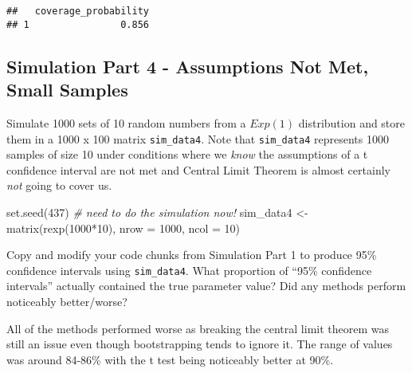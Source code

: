 \documentclass[
]{article}
\newenvironment{Shaded}{\begin{snugshade}}{\end{snugshade}}
\newcommand{\AttributeTok}[1]{\textcolor[rgb]{0.77,0.63,0.00}{#1}}
\newcommand{\CommentTok}[1]{\textcolor[rgb]{0.56,0.35,0.01}{\textit{#1}}}
\newcommand{\DecValTok}[1]{\textcolor[rgb]{0.00,0.00,0.81}{#1}}
\newcommand{\FunctionTok}[1]{\textcolor[rgb]{0.00,0.00,0.00}{#1}}
\newcommand{\NormalTok}[1]{#1}
\newcommand{\OtherTok}[1]{\textcolor[rgb]{0.56,0.35,0.01}{#1}}
\newcommand{\SpecialCharTok}[1]{\textcolor[rgb]{0.00,0.00,0.00}{#1}}
\begin{document}
\begin{verbatim}
##   coverage_probability
## 1                0.856
\end{verbatim}

\hypertarget{simulation-part-4---assumptions-not-met-small-samples}{%
\subsection{Simulation Part 4 - Assumptions Not Met, Small
Samples}\label{simulation-part-4---assumptions-not-met-small-samples}}

Simulate 1000 sets of 10 random numbers from a \(Exp(1)\) distribution
and store them in a 1000 x 100 matrix \texttt{sim\_data4}. Note that
\texttt{sim\_data4} represents 1000 samples of size 10 under conditions
where we \emph{know} the assumptions of a t confidence interval are not
met and Central Limit Theorem is almost certainly \emph{not} going to
cover us.

\begin{Shaded}
\begin{Highlighting}[]
\FunctionTok{set.seed}\NormalTok{(}\DecValTok{437}\NormalTok{)}
\CommentTok{\# need to do the simulation now!}
\NormalTok{sim\_data4 }\OtherTok{\textless{}{-}} \FunctionTok{matrix}\NormalTok{(}\FunctionTok{rexp}\NormalTok{(}\DecValTok{1000}\SpecialCharTok{*}\DecValTok{10}\NormalTok{), }\AttributeTok{nrow =} \DecValTok{1000}\NormalTok{, }\AttributeTok{ncol =} \DecValTok{10}\NormalTok{)}
\end{Highlighting}
\end{Shaded}

Copy and modify your code chunks from Simulation Part 1 to produce 95\%
confidence intervals using \texttt{sim\_data4}. What proportion of
``95\% confidence intervals'' actually contained the true parameter
value? Did any methods perform noticeably better/worse?

All of the methods performed worse as breaking the central limit theorem
was still an issue even though bootstrapping tends to ignore it. The
range of values was around 84-86\% with the t test being noticeably
better at 90\%.
\end{document}
